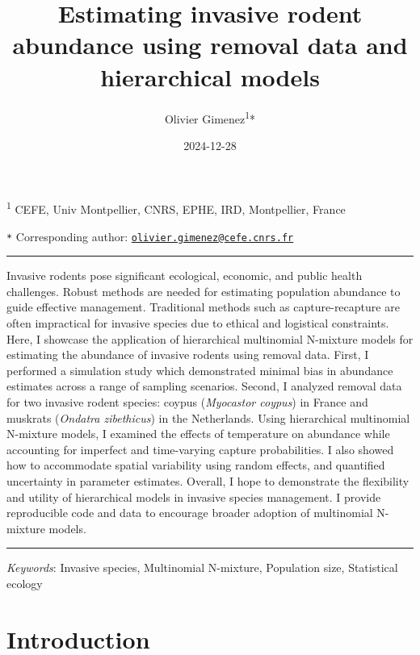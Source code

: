 \documentclass[
  11pt,
  a4paper,
]{article}
\title{Estimating invasive rodent abundance using removal data and hierarchical models}
\author{Olivier Gimenez\textsuperscript{1}*}
\date{2024-12-28}
\begin{document}
\maketitle

\linenumbers

\small

\textsuperscript{1} CEFE, Univ Montpellier, CNRS, EPHE, IRD, Montpellier, France

\texttt{*} Corresponding author: \href{mailto:olivier.gimenez@cefe.cnrs.fr}{\nolinkurl{olivier.gimenez@cefe.cnrs.fr}}

\normalsize

\vspace{1cm}
\hrule

Invasive rodents pose significant ecological, economic, and public health challenges. Robust methods are needed for estimating population abundance to guide effective management. Traditional methods such as capture-recapture are often impractical for invasive species due to ethical and logistical constraints. Here, I showcase the application of hierarchical multinomial N-mixture models for estimating the abundance of invasive rodents using removal data. First, I performed a simulation study which demonstrated minimal bias in abundance estimates across a range of sampling scenarios. Second, I analyzed removal data for two invasive rodent species: coypus (\emph{Myocastor coypus}) in France and muskrats (\emph{Ondatra zibethicus}) in the Netherlands. Using hierarchical multinomial N-mixture models, I examined the effects of temperature on abundance while accounting for imperfect and time-varying capture probabilities. I also showed how to accommodate spatial variability using random effects, and quantified uncertainty in parameter estimates. Overall, I hope to demonstrate the flexibility and utility of hierarchical models in invasive species management. I provide reproducible code and data to encourage broader adoption of multinomial N-mixture models.

\vspace{3mm}
\hrule
\vspace{5mm}

\emph{Keywords}: Invasive species, Multinomial N-mixture, Population size, Statistical ecology

\newpage

\section{Introduction}\label{introduction}
\end{document}
